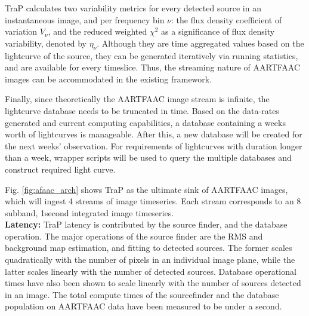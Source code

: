 \documentclass{ws-jai}
\begin{document}
TraP  calculates  two  variability  metrics  for every  detected  source  in  an
instantaneous image, and  per frequency bin $\nu$: the  flux density coefficient
of variation $V_{\nu}$,  and the reduced weighted $\chi^2$ as  a significance of
flux  density  variability, denoted  by  $\eta_{\nu}$.  Although they  are  time
aggregated values based  on the lightcurve of the source,  they can be generated
iteratively  via running  statistics,  and are  available  for every  timeslice.
Thus,  the streaming  nature  of  AARTFAAC images  can  be  accommodated in  the
existing framework.

Finally,  since  theoretically  the  AARTFAAC  image  stream  is  infinite,  the
lightcurve database  needs to  be truncated  in time.   Based on  the data-rates
generated  and current  computing capabilities,  a database  containing a  weeks
worth of lightcurves is manageable.  After  this, a new database will be created
for the next  weeks' observation. For requirements of  lightcurves with duration
longer than a week, wrapper scripts will be used to query the multiple databases
and construct required light curve.

Fig. \ref{fig:afaac_arch}  shows TraP as  the ultimate sink of  AARTFAAC images,
which will ingest 4 streams of image timeseries. Each stream corresponds to an 8
subband, 1second integrated image timeseries.\\

\noindent \textbf {Latency:}  TraP latency is contributed by  the source finder,
and the  database operation. The major  operations of the source  finder are the
RMS and background  map estimation, and fitting to detected  sources. The former
scales quadratically  with the number  of pixels  in an individual  image plane,
while the latter scales linearly with  the number of detected sources.  Database
operational times  have also  been shown  to scale linearly  with the  number of
sources detected  in an image. The  total compute times of  the sourcefinder and
the  database population  on AARTFAAC  data  have been  measured to  be under  a
second.


\end{document}
